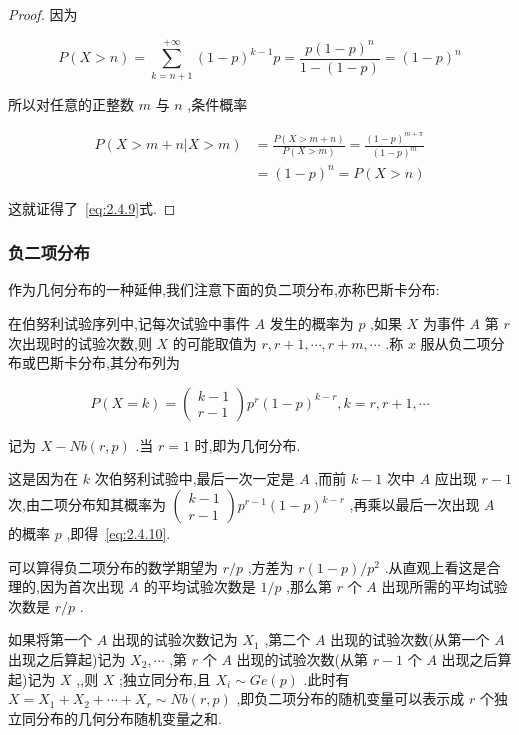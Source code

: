 \begin{proof}
	因为
	
	\[
	P(X>n)=\sum_{k=n+1}^{+\infty}(1-p)^{k-1} p=\frac{p(1-p)^{n}}{1-(1-p)}=(1-p)^{n}
	\]
	
	所以对任意的正整数 $ m $ 与 $ n $ ,条件概率
	
	\[
	\begin{aligned} P(X>m+n | X>m) &=\frac{P(X>m+n)}{P(X>m)}=\frac{(1-p)^{m+\pi}}{(1-p)^{m}} \\ &=(1-p)^{n}=P(X>n) \end{aligned}
	\]
	
	这就证得了~\ref{eq:2.4.9}式.
\end{proof}

\subsubsection{负二项分布}

作为几何分布的一种延伸,我们注意下面的负二项分布,亦称巴斯卡分布:

在伯努利试验序列中,记每次试验中事件 $ A $ 发生的概率为 $ p $ ,如果 $ X $ 为事件 $ A $ 第 $ r $ 次出现时的试验次数,则 $ X $ 的可能取值为 $ r, r+1, \cdots, r+m, \cdots $ .称 $ x $ 服从负二项分布或巴斯卡分布,其分布列为

\begin{equation}
P(X=k)=\left( \begin{array}{l}{k-1} \\ {r-1}\end{array}\right) p^{r}(1-p)^{k-r}, k=r, r+1, \cdots \label{eq:2.4.10}
\end{equation}

记为 $ X-N b(r, p) $ .当 $ r=1 $ 时,即为几何分布.

这是因为在 $ k $ 次伯努利试验中,最后一次一定是 $ A $ ,而前 $ k-1 $ 次中 $ A $ 应出现 $ r-1 $ 次,由二项分布知其概率为 $ \left( \begin{array}{l}{k-1} \\ {r-1}\end{array}\right) p^{r-1}(1-p)^{k-r} $ ,再乘以最后一次出现 $ A $ 的概率 $ p $ ,即得~\ref{eq:2.4.10}.

可以算得负二项分布的数学期望为 $ r / p $ ,方差为 $ r(1-p)/p^{2} $ .从直观上看这是合理的,因为首次出现 $ A $ 的平均试验次数是 $ 1/p $ ,那么第 $ r $ 个 $ A $ 出现所需的平均试验次数是 $ r / p $ .

如果将第一个 $ A $ 出现的试验次数记为 $ X_{1} $ ,第二个 $ A $ 出现的试验次数(从第一个 $ A $ 出现之后算起)记为 $ X_{2}, \cdots $ ,第 $ r $ 个 $ A $ 出现的试验次数(从第 $ r-1 $ 个 $ A $ 出现之后算起)记为 $ X $ ,,则 $ X $ ;独立同分布,且 $ X_{i} \sim G e(p) $ .此时有 $ X=X_{1}+ X_{2}+\cdots+X_{r} \sim N b(r, p) $ ,即负二项分布的随机变量可以表示成 $ r $ 个独立同分布的几何分布随机变量之和.

